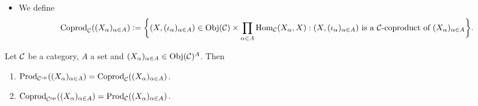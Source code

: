 \documentclass{book}
\begin{document}
\begin{defn}
\begin{itemize}
\begin{itemize}
\[\begin{tikzcd}[baseline= 7]
					& X_{\al} \arrow[dl, "\iota_{\al}"'] \arrow[ddl, "i_{\al}"', bend left=30, swap] & \\
					X \arrow[d, "\phi"', dashed] & \\
					Y 
				\end{tikzcd}
				\] 
				\item We define 
				$$\operatorname{Coprod}_{\mathcal{C}}((X_{\alpha})_{\alpha \in A}) \vcentcolon= \bigg \{(X, (\iota_{\alpha})_{\alpha \in A}) \in \operatorname{Obj}(\mathcal{C}) \times \prod\limits_{\alpha \in A} \operatorname{Hom}_{\mathcal{C}}(X_{\alpha}, X): \text{$(X, (\iota_{\alpha})_{\alpha \in A})$ is a $\mathcal{C}$-coproduct of $(X_{\alpha})_{\alpha \in A}$} \bigg \}.$$
			\end{itemize}
		\end{itemize}
	\end{defn}
	
	\begin{ex}
		Let $\mathcal{C}$ be a category, $A$ a set  and $(X_{\alpha})_{\alpha \in A} \in \operatorname{Obj}(\mathcal{C})^A$. Then 
		\begin{enumerate}
			\item $\operatorname{Prod}_{{\mathcal{C}}^{\text{op}}}((X_{\alpha})_{\alpha \in A}) = \operatorname{Coprod}_{\mathcal{C}}((X_{\alpha})_{\alpha \in A})$.
			\item $\operatorname{Coprod}_{{\mathcal{C}}^{\text{op}}}((X_{\alpha})_{\alpha \in A}) = \operatorname{Prod}_{\mathcal{C}}((X_{\alpha})_{\alpha \in A})$.
		\end{enumerate}
	\end{ex}
	
\end{document}
